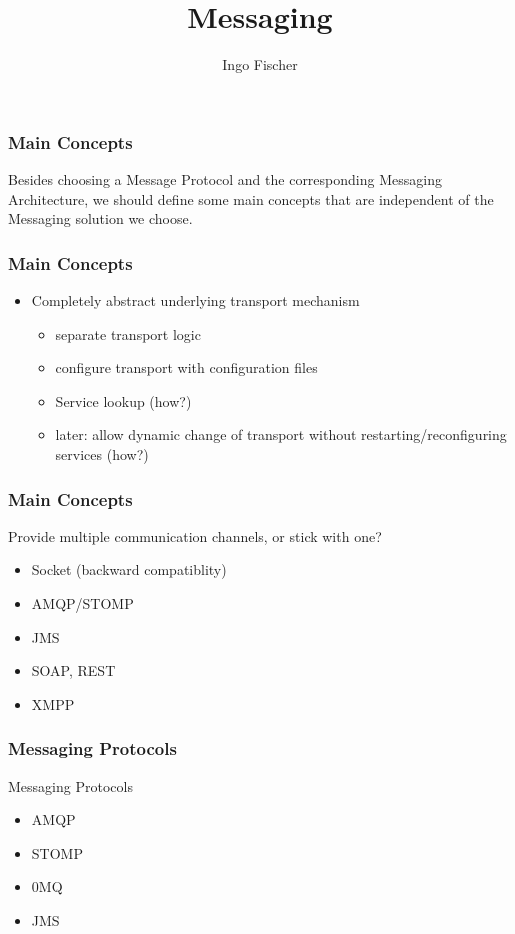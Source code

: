 \documentclass[serif,mathserif]{beamer}
\author[Ingo Fischer]{Ingo Fischer}
\title[Messaging\hspace{2em}\insertframenumber/\inserttotalframenumber]{Messaging}
\date{} %
\institute{ProfitBricks GmbH}
\begin{document}
\maketitle


\begin{frame}
\frametitle{Main Concepts}
Besides choosing a Message Protocol and the corresponding Messaging Architecture, 
we should define some main concepts that are independent of the Messaging solution we choose.
\end{frame}

\begin{frame}
\frametitle{Main Concepts}
\begin{itemize}
  \item Completely abstract underlying transport mechanism
  \begin{itemize}
    \item separate transport logic
    \item configure transport with configuration files
    \item Service lookup (how?)
    \item later: allow dynamic change of transport without
    restarting/reconfiguring services (how?)
  \end{itemize}
\end{itemize}
\end{frame}

\begin{frame}
\frametitle{Main Concepts}
Provide multiple communication channels, or stick with one?
\begin{itemize}
  \item Socket (backward compatiblity)
  \item AMQP/STOMP
  \item JMS
  \item SOAP, REST
  \item XMPP
\end{itemize}
\end{frame}

\begin{frame}
\frametitle{Messaging Protocols}
Messaging Protocols
\begin{itemize}
  \item AMQP
  \item STOMP
  \item 0MQ
  \item JMS
\end{itemize}
\end{frame}
\end{document}
